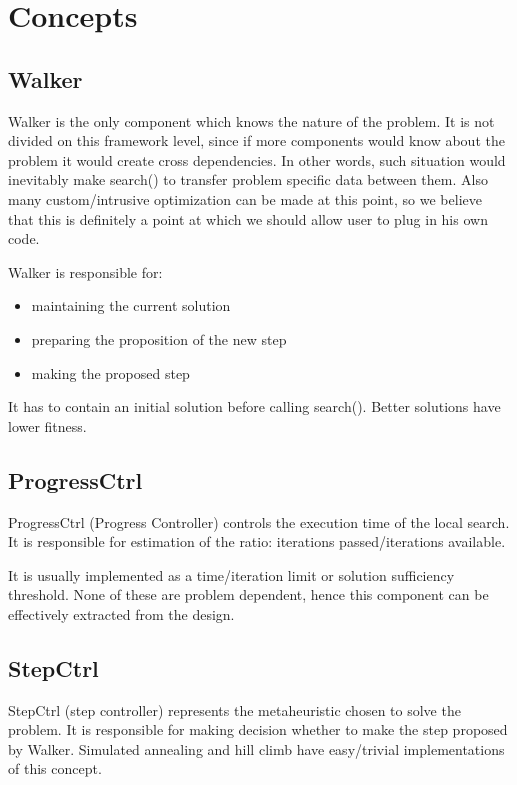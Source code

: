 \section{Concepts}

\subsection{Walker}

Walker is the only component which knows the nature of the problem.
It is not divided on this framework level, since if more components would know about the problem it would create cross dependencies.
In other words, such situation would inevitably make search() to transfer problem specific data between them.
Also many custom/intrusive optimization can be made at this point, so we believe that this is definitely a point at which we should allow user to plug in
his own code.

Walker is responsible for:
\begin{itemize}
\item maintaining the current solution
\item preparing the proposition of the new step
\item making the proposed step
\end{itemize}

It has to contain an initial solution before calling search().
Better solutions have lower fitness.

\subsection{ProgressCtrl}

ProgressCtrl (Progress Controller) controls the execution time of the
local search. It is responsible for estimation of the ratio: iterations
passed/iterations available.

It is usually implemented as a time/iteration limit or solution sufficiency threshold.
None of these are problem dependent, hence this component can be effectively extracted from the design.

\subsection{StepCtrl}

StepCtrl (step controller) represents the metaheuristic chosen to
solve the problem. It is responsible for making decision whether to
make the step proposed by Walker.
Simulated annealing and hill climb have easy/trivial implementations of this concept.

